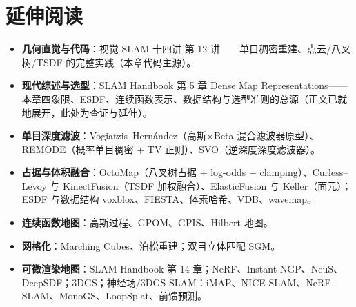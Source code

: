 \section*{延伸阅读}
\begin{itemize}
  \item \textbf{几何直觉与代码}：视觉 SLAM 十四讲\cite{gaoxiang2019slam14} 第 12 讲——单目稠密重建、点云/八叉树/TSDF 的完整实践（本章代码主源）。
  \item \textbf{现代综述与选型}：SLAM Handbook\cite{carlone2026handbook} 第 5 章 Dense Map Representations——本章四象限、ESDF、连续函数表示、数据结构与选型准则的总源（正文已就地展开，此处为查证与延伸）。
  \item \textbf{单目深度滤波}：Vogiatzis--Hernández\cite{vogiatzis2011video}（高斯×Beta 混合滤波器原型）、REMODE\cite{pizzoli2014remode}（概率单目稠密 $+$ TV 正则）、SVO\cite{forster2017svo}（逆深度深度滤波器）。
  \item \textbf{占据与体积融合}：OctoMap\cite{hornung2013octomap}（八叉树占据 $+$ log-odds $+$ clamping）、Curless--Levoy\cite{curless1996volumetric} 与 KinectFusion\cite{newcombe2011kinectfusion}（TSDF 加权融合）、ElasticFusion\cite{whelan2015elasticfusion} 与 Keller\cite{keller2013pointfusion}（面元）；ESDF 与数据结构 voxblox\cite{oleynikova2017voxblox}、FIESTA\cite{han2019fiesta}、体素哈希\cite{niessner2013voxelhashing}、VDB\cite{museth2013vdb}、wavemap\cite{reijgwart2023wavemap}。
  \item \textbf{连续函数地图}：高斯过程\cite{rasmussen2006gp}、GPOM\cite{omeadhra2019gpom}、GPIS\cite{williams2007gpis}、Hilbert 地图\cite{ramos2016hilbert}。
  \item \textbf{网格化}：Marching Cubes\cite{lorensen1987marchingcubes}、泊松重建\cite{kazhdan2006poisson}；双目立体匹配 SGM\cite{hirschmuller2008sgm}。
  \item \textbf{可微渲染地图}：SLAM Handbook\cite{carlone2026handbook} 第 14 章；NeRF\cite{mildenhall2020nerf}、Instant-NGP\cite{mueller2022instantngp}、NeuS\cite{wang2021neus}、DeepSDF\cite{park2019deepsdf}；3DGS\cite{kerbl2023gaussian}；神经场/3DGS SLAM：iMAP\cite{sucar2021imap}、NICE-SLAM\cite{zhu2022niceslam}、NeRF-SLAM\cite{rosinol2023nerfslam}、MonoGS\cite{matsuki2024monogs}、LoopSplat\cite{zhu2024loopsplat}、前馈预测\cite{charatan2024pixelsplat}。
\end{itemize}

